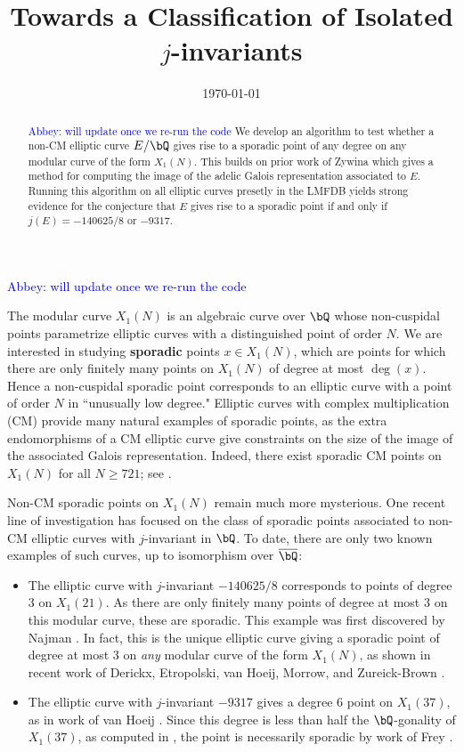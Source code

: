\documentclass[11pt,reqno]{amsart}
\title{Towards a Classification of Isolated $j$-invariants}
\date{\today}
\theoremstyle{plain}
\theoremstyle{definition}
\newcommand{\Q}{\bQ}
\newcommand{\abbey}[1]{\textcolor{blue}{Abbey: #1}}
\begin{document}
\begin{abstract} \abbey{will update once we re-run the code}
We develop an algorithm to test whether a non-CM elliptic curve $E/\Q$ gives rise to a sporadic point of any degree on any modular curve of the form $X_1(N)$. This builds on prior work of Zywina which gives a method for computing the image of the adelic Galois representation associated to $E$. Running this algorithm on all elliptic curves presetly in the LMFDB yields strong evidence for the conjecture that $E$ gives rise to a sporadic point if and only if $j(E)=-140625/8$ or $-9317$.
    \end{abstract}
\maketitle
\abbey{will update once we re-run the code}

The modular curve $X_1(N)$ is an algebraic curve over $\Q$ whose non-cuspidal points parametrize elliptic curves with a distinguished point of order $N$. We are interested in studying \textbf{sporadic} points $x \in X_1(N)$, which are points for which there are only finitely many points on $X_1(N)$ of degree at most $\deg(x)$. Hence a non-cuspidal sporadic point corresponds to an elliptic curve with a point of order $N$ in ``unusually low degree." Elliptic curves with complex multiplication (CM) provide many natural examples of sporadic points, as the extra endomorphisms of a CM elliptic curve give constraints on the size of the image of the associated Galois representation. Indeed, there exist sporadic CM points on $X_1(N)$ for all $N\geq 721$; see \cite[Theorem 8.2]{CGPS2022}.

Non-CM sporadic points on $X_1(N)$ remain much more mysterious. One recent line of investigation has focused on the class of sporadic points associated to non-CM elliptic curves with $j$-invariant in $\Q$. To date, there are only two known examples of such curves, up to isomorphism over $\overline{\Q}$:
\begin{itemize}
\item The elliptic curve with $j$-invariant $-140625/8$ corresponds to points of degree 3 on $X_1(21)$. As there are only finitely many points of degree at most 3 on this modular curve, these are sporadic. This example was first discovered by Najman \cite{najman16}. In fact, this is the unique elliptic curve giving a sporadic point of degree at most 3 on \emph{any} modular curve of the form $X_1(N)$, as shown in recent work of Derickx, Etropolski, van Hoeij, Morrow, and Zureick-Brown \cite{DEvHMZB2021}.
\item The elliptic curve with $j$-invariant $-9317$ gives a degree 6 point on $X_1(37)$, as in work of van Hoeij \cite{vanHoeij}. Since this degree is less than half the $\Q$-gonality of $X_1(37)$, as computed in \cite{DerickxVanHoeij2014}, the point is necessarily sporadic by work of Frey \cite{frey}.
\end{itemize}
\end{document}
